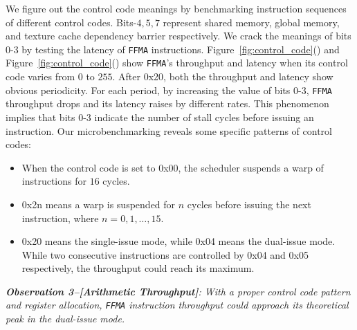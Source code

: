 We figure out the control code meanings by benchmarking instruction sequences of different control codes.
Bits-$4, 5, 7$ represent shared memory, global memory, and texture cache dependency barrier respectively.
We crack the meanings of bits $0$-$3$ by testing the latency of {\tt FFMA} instructions.
Figure~\ref{fig:control_code}() and
Figure~\ref{fig:control_code}() show {\tt FFMA}'s throughput and latency when its control code varies from $0$ to $255$.
After 0x20, both the throughput and latency show obvious periodicity.
For each period, by increasing the value of bits $0$-$3$, {\tt FFMA} throughput drops and its latency raises by different rates. 
This phenomenon implies that bits $0$-$3$ indicate the number of stall cycles before issuing
an instruction.
Our microbenchmarking reveals some specific patterns of control codes:

\begin{itemize}
\item When the control code is set to 0x00, the scheduler suspends a warp of instructions for $16$ cycles.
\item 0x2n means a warp is suspended for $n$ cycles before issuing the next instruction, where $n=0, 1,\dots, 15$.
\item 0x20 means the single-issue mode, while 0x04 means the dual-issue mode.
While two consecutive instructions are controlled by 0x04 and 0x05 respectively, the throughput could reach its maximum.
\end{itemize}

{\em {\bf Observation 3--[Arithmetic Throughput]}:
With a proper control code pattern and register allocation, {\tt FFMA}
instruction throughput could approach its theoretical peak in the dual-issue mode.}

